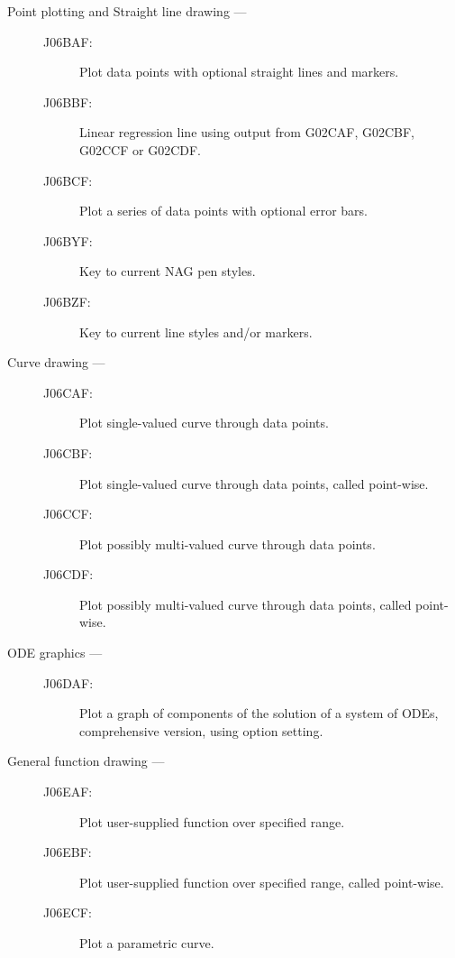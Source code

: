 \begin{description}
\item [Point plotting and Straight line drawing ---]

\begin{description}
\item [J06BAF:]  Plot data points with optional straight lines and markers.
\item [J06BBF:]  Linear regression line using output from G02CAF, G02CBF, G02CCF or G02CDF.
\item [J06BCF:]  Plot a series of data points with optional error bars.
\item [J06BYF:]  Key to current NAG pen styles.
\item [J06BZF:]  Key to current line styles and/or markers.
\end{description}

\item [Curve drawing ---]

\begin{description}
\item [J06CAF:]  Plot single-valued curve through data points.
\item [J06CBF:]  Plot single-valued curve through data points, called point-wise.
\item [J06CCF:]  Plot possibly multi-valued curve through data points.
\item [J06CDF:]  Plot possibly multi-valued curve through data points, called point-wise.
\end{description}

\item [ODE graphics ---]

\begin{description}
\item [J06DAF:]  Plot a graph of components of the solution of a system of ODEs, comprehensive version, using option setting.
\end{description}

\item [General function drawing ---]

\begin{description}
\item [J06EAF:]  Plot user-supplied function over specified range.
\item [J06EBF:]  Plot user-supplied function over specified range, called point-wise.
\item [J06ECF:]  Plot a parametric curve.
\end{description}

\newpage


\end{description}
